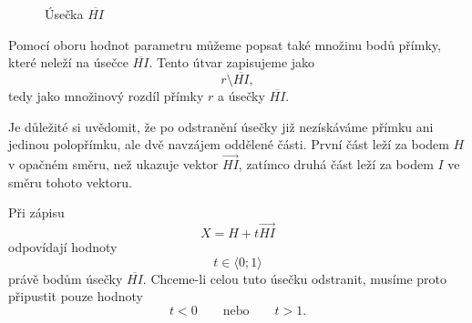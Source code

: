 \begin{figure}[H]
    \centering
    \caption{Úsečka $\overline{HI}$}
    \label{fig:Parametric_segment_HI}
\end{figure}

Pomocí oboru hodnot parametru můžeme popsat také množinu bodů přímky,
které neleží na úsečce $\overline{HI}$. Tento útvar zapisujeme jako
\[
    r\setminus\overline{HI},
\]
tedy jako množinový rozdíl přímky $r$ a úsečky $\overline{HI}$.

Je důležité si uvědomit, že po odstranění úsečky již nezískáváme přímku
ani jedinou polopřímku, ale dvě navzájem oddělené části. První část leží
za bodem $H$ v opačném směru, než ukazuje vektor $\overrightarrow{HI}$,
zatímco druhá část leží za bodem $I$ ve směru tohoto vektoru.

Při zápisu
\[
    X=H+t\overrightarrow{HI}
\]
odpovídají hodnoty
\[
    t\in\langle0;1\rangle
\]
právě bodům úsečky $\overline{HI}$. Chceme-li celou tuto úsečku odstranit,
musíme proto připustit pouze hodnoty
\[
    t<0
    \qquad\text{nebo}\qquad
    t>1.
\]

